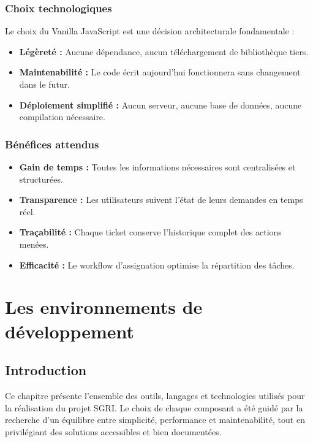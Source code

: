 \documentclass[12pt,a4paper,oneside]{report}
\begin{document}
\subsection{Choix technologiques}

Le choix du Vanilla JavaScript est une décision architecturale fondamentale :
\begin{itemize}
    \item \textbf{Légèreté :} Aucune dépendance, aucun téléchargement de bibliothèque tiers.
    \item \textbf{Maintenabilité :} Le code écrit aujourd'hui fonctionnera sans changement dans le futur.
    \item \textbf{Déploiement simplifié :} Aucun serveur, aucune base de données, aucune compilation nécessaire.
\end{itemize}

\subsection{Bénéfices attendus}

\begin{itemize}
    \item \textbf{Gain de temps :} Toutes les informations nécessaires sont centralisées et structurées.
    \item \textbf{Transparence :} Les utilisateurs suivent l'état de leurs demandes en temps réel.
    \item \textbf{Traçabilité :} Chaque ticket conserve l'historique complet des actions menées.
    \item \textbf{Efficacité :} Le workflow d'assignation optimise la répartition des tâches.
\end{itemize}

\chapter{Les environnements de développement}

\section{Introduction}

Ce chapitre présente l'ensemble des outils, langages et technologies utilisés pour la réalisation du projet SGRI. Le choix de chaque composant a été guidé par la recherche d'un équilibre entre simplicité, performance et maintenabilité, tout en privilégiant des solutions accessibles et bien documentées.
\end{document}
